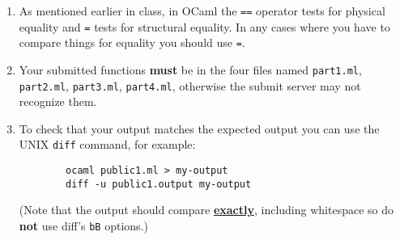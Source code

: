 \documentclass[11pt]{article}
\begin{document}
\begin{enumerate}
      \item As mentioned earlier in class, in OCaml the \texttt{==} operator
            tests for physical equality and \texttt{=} tests for structural
            equality.  In any cases where you have to compare things for
            equality you should use \texttt{=}.



      \item Your submitted functions \textbf{must} be in the four files
            named \texttt{part1.ml}, \texttt{part2.ml}, \texttt{part3.ml},
            \texttt{part4.ml}, otherwise the submit server may not recognize
            them.

      \item To check that your output matches the expected output you can
            use the UNIX \texttt{diff} command, for example:

            \vspace{-5.5mm}

            \begin{center}

              \begin{BVerbatim}
        ocaml public1.ml > my-output
        diff -u public1.output my-output
              \end{BVerbatim}

            \end{center}

            \vspace{-3mm}

            (Note that the output should compare
            \textbf{\underline{exactly}}, including whitespace so do
            \textbf{not} use diff's \texttt{bB} options.)


\end{enumerate}
\end{document}
